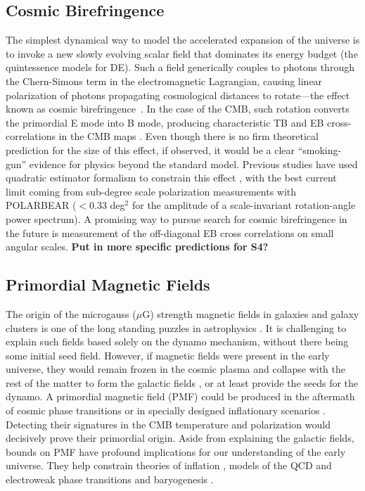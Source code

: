 \subsection{Cosmic Birefringence}
The simplest dynamical way to model the accelerated expansion of the universe is to invoke a new slowly evolving scalar field that dominates its energy budget (the quintessence models for DE). Such a field generically couples to photons through the Chern-Simons term in the electromagnetic Lagrangian, causing linear polarization of photons propagating cosmological distances to rotate---the effect known as cosmic birefringence~\cite{1998PhRvL..81.3067C}. In the case of the CMB, such rotation converts the primordial E mode into B mode, producing characteristic TB and EB cross-correlations in the CMB maps \cite{2009PhRvL.102k1302K,2009PhRvD..80b3510G}. Even though there is no firm theoretical prediction for the size of this effect, if observed, it would be a clear “smoking-gun” evidence for physics beyond the standard model. Previous studies have used quadratic estimator formalism to constrain this effect \cite{2012PhRvD..86j3529G}, with the best current limit coming from sub-degree scale polarization measurements with POLARBEAR \cite{Ade:2015cao} ($<0.33$ deg$^2$ for the amplitude of a scale-invariant rotation-angle power spectrum). A promising way to pursue search for cosmic birefringence in the future is measurement of the off-diagonal EB cross correlations on small angular scales. {\bf Put in more specific predictions for S4?}

\subsection{Primordial Magnetic Fields}

The origin of the microgauss ($\mu$G) strength magnetic fields in galaxies and galaxy clusters is one of the long standing puzzles in astrophysics \cite{Durrer:2013pga}. It is challenging to explain such fields based solely on the dynamo mechanism, without there being some initial seed field. However, if magnetic fields were present in the early universe, they would remain frozen in the cosmic plasma and collapse with the rest of the matter to form the galactic fields \cite{Grasso:2000wj}, or at least provide the seeds for the dynamo. A primordial magnetic field (PMF) could be produced in the aftermath of cosmic phase transitions \cite{Vachaspati:1991nm} or in specially designed inflationary scenarios \cite{Turner:1987bw,Ratra:1991bn}. Detecting their signatures in the CMB temperature and polarization would decisively prove their primordial origin. Aside from explaining the galactic fields, bounds on PMF have profound implications for our understanding of the early universe.  They help constrain theories of inflation \cite{Bonvin:2011dt}, models of the QCD and electroweak phase transitions \cite{Caprini:2007xq} and baryogenesis \cite{Vachaspati:2001nb}.

